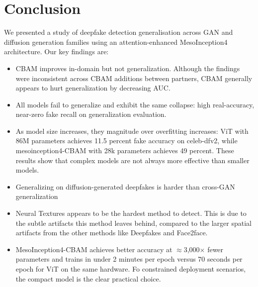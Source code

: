 \documentclass[conference]{IEEEtran}
\begin{document}
\section{Conclusion}\label{sec:conclusion}

We presented a study of deepfake detection generalisation across GAN
and diffusion generation families using an attention-enhanced
MesoInception4 architecture.  Our key findings are:

\begin{itemize}
  \item CBAM improves in-domain but not generalization. Although the findings were inconsistent across CBAM additions between partners, CBAM generally appears to hurt generalization by decreasing AUC.
  \item All models fail to generalize and exhibit the same collapse: high real-accuracy, near-zero fake recall on generalization evaluation.
  \item As model size increases, they magnitude over overfitting increases: ViT with 86M parameters achieves 11.5 percent fake accuracy on celeb-dfv2, while mesoinception4-CBAM with 28k parameters achieves 49 percent. These results show that complex models are not always more effective than smaller models.
  \item Generalizing on diffusion-generated deepfakes is harder than cross-GAN generalization
  \item Neural Textures appears to be the hardest method to detect. This is due to the subtle artifacts this method leaves behind, compared to the larger spatial artifacts from the other methods like Deepfakes and Face2face.
  \item MesoInception4-CBAM achieves better accuracy at $\approx$3{,}000$\times$ fewer parameters and trains in under 2 minutes per epoch versus 70 seconds per epoch for ViT on the same hardware.  Fo constrained deployment scenarios, the compact model is the clear practical choice.
\end{itemize}
\end{document}
